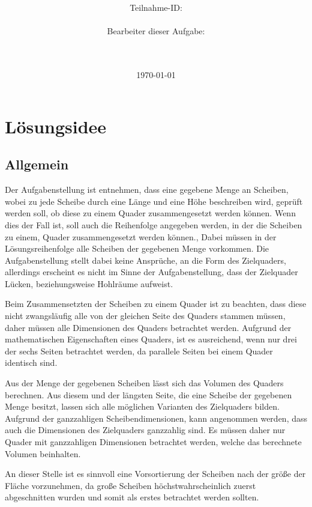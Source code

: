 \documentclass[a4paper,10pt,ngerman]{scrartcl}
\title{\textbf{\Huge\Aufgabe}}
\author{\LARGE Teilnahme-ID: \LARGE \TeilnahmeId \\\\
\LARGE Bearbeiter dieser Aufgabe: \\
\LARGE \Name\\\\}
\date{\LARGE\today}
\begin{document}
    \maketitle
    \tableofcontents
    \vspace{0.5cm}
    \newpage


    \section{Lösungsidee}\label{sec:losungsidee}

    \subsection{Allgemein}\label{subsec:allgemein}

    Der Aufgabenstellung ist entnehmen, dass eine gegebene Menge an Scheiben, wobei zu jede Scheibe durch
    eine Länge und eine Höhe beschreiben wird, geprüft werden soll, ob diese zu einem Quader zusammengesetzt werden können.
    Wenn dies der Fall ist, soll auch die Reihenfolge angegeben werden, in der die Scheiben zu einem, Quader zusammengesetzt werden können.,
    Dabei müssen in der Lösungsreihenfolge alle Scheiben der gegebenen Menge vorkommen.
    Die Aufgabenstellung stellt dabei keine Ansprüche, an die Form des Zielquaders, allerdings erscheint es nicht im Sinne der Aufgabenstellung,
    dass der Zielquader Lücken, beziehungsweise Hohlräume aufweist.

    Beim Zusammensetzten der Scheiben zu einem Quader ist zu beachten, dass diese nicht zwangsläufig alle von der gleichen Seite des Quaders stammen müssen,
    daher müssen alle Dimensionen des Quaders betrachtet werden.
    Aufgrund der mathematischen Eigenschaften eines Quaders, ist es ausreichend, wenn nur drei der sechs Seiten betrachtet werden,
    da parallele Seiten bei einem Quader identisch sind.

    Aus der Menge der gegebenen Scheiben lässt sich das Volumen des Quaders berechnen.
    Aus diesem und der längsten Seite, die eine Scheibe der gegebenen Menge besitzt, lassen sich alle möglichen Varianten des Zielquaders bilden.
    Aufgrund der ganzzahligen Scheibendimensionen, kann angenommen werden, dass auch die Dimensionen des Zielquaders ganzzahlig sind.
    Es müssen daher nur Quader mit ganzzahligen Dimensionen betrachtet werden, welche das berechnete Volumen beinhalten.

    An dieser Stelle ist es sinnvoll eine Vorsortierung der Scheiben nach der größe der Fläche vorzunehmen,
    da große Scheiben höchstwahrscheinlich zuerst abgeschnitten wurden und somit als erstes betrachtet werden sollten.
\end{document}
